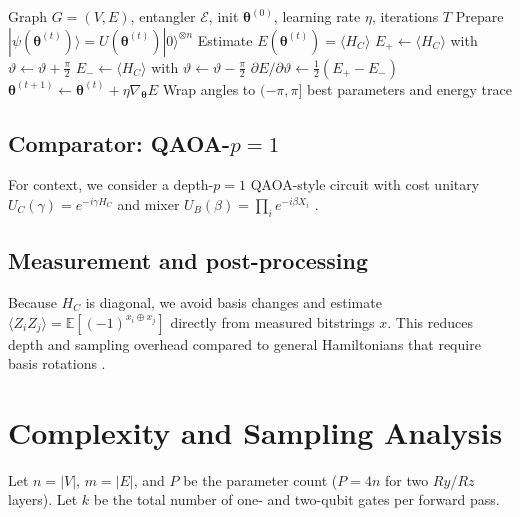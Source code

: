 \begin{algorithm}[htbp]
\caption{Parameter-shift training for a hardware-matched Max-Cut VQC}
\label{alg:train}
\begin{algorithmic}[1]
\Require Graph $G=(V,E)$, entangler $\mathcal{E}$, init $\boldsymbol{\theta}^{(0)}$, learning rate $\eta$, iterations $T$
  \State Prepare $|\psi(\boldsymbol{\theta}^{(t)})\rangle = U(\boldsymbol{\theta}^{(t)})|0\rangle^{\otimes n}$
  \State Estimate $E(\boldsymbol{\theta}^{(t)})=\langle H_C \rangle$
     \State $E_{+}\leftarrow \langle H_C \rangle$ with $\vartheta \gets \vartheta + \tfrac{\pi}{2}$
     \State $E_{-}\leftarrow \langle H_C \rangle$ with $\vartheta \gets \vartheta - \tfrac{\pi}{2}$
     \State $\partial E/\partial \vartheta \gets \tfrac{1}{2}(E_{+}-E_{-})$
  \EndFor
  \State $\boldsymbol{\theta}^{(t{+}1)} \gets \boldsymbol{\theta}^{(t)} + \eta \nabla_{\boldsymbol{\theta}} E$
  \State Wrap angles to $(-\pi,\pi]$
\EndFor
\State \Return best parameters and energy trace
\end{algorithmic}
\end{algorithm}

\subsection{Comparator: QAOA-$p{=}1$}
For context, we consider a depth-$p{=}1$ QAOA-style circuit with cost unitary $U_C(\gamma)=e^{-i\gamma H_C}$ and mixer $U_B(\beta)=\prod_i e^{-i\beta X_i}$ \cite{farhi2014qaoa,hadfield2019qaoaops}.

\subsection{Measurement and post-processing}
Because $H_C$ is diagonal, we avoid basis changes and estimate $\langle Z_i Z_j\rangle = \mathbb{E}[(-1)^{x_i \oplus x_j}]$ directly from measured bitstrings $x$. This reduces depth and sampling overhead compared to general Hamiltonians that require basis rotations \cite{huggins2021efficient,verteletskyi2020measurement}.

\section{Complexity and Sampling Analysis}
Let $n=|V|$, $m=|E|$, and $P$ be the parameter count ($P=4n$ for two $Ry$/$Rz$ layers). Let $k$ be the total number of one- and two-qubit gates per forward pass.

